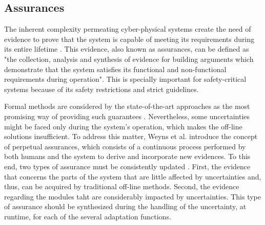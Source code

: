 	
	
	
    

\subsection{Assurances}

The inherent complexity permeating cyber-physical systems create the need of evidence to prove that the system is capable of meeting its requirements during its entire lifetime \cite{assurances2017}. This evidence, also known as assurances, can be defined as "the collection, analysis and synthesis of evidence for building arguments which demonstrate that the system satisfies its functional and non-functional requirements during operation". This is specially important for safety-critical systems because of its safety restrictions and strict guidelines.

Formal methods are considered by the state-of-the-art approaches as the most promising way of providing such guarantees  \cite{assurances2017}. Nevertheless, some uncertainties might be faced only during the system's operation, which makes the off-line solutions insufficient. To address this matter, Weyns et al. \cite{2019PerpetualAssurancesWeyns} introduce the concept of perpetual assurances, which consists of a continuous process performed by both humans and the system to derive and incorporate new evidences. To this end, two types of assurance must be consistently updated  \cite{assurances2017}. First, the evidence that concerns the parts of the system that are little affected by uncertainties and, thus, can be acquired by traditional off-line methods. Second, the evidence regarding the modules taht are considerably impacted by uncertainties. This type of assurance should be synthesized during the handling of the uncertainty, at runtime, for each of the several adaptation functions.

